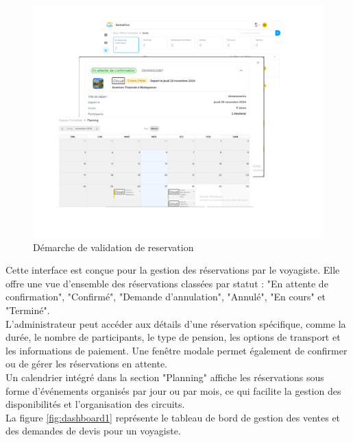 \documentclass[12pt]{report}
\begin{document}
			\begin{figure}[h]
				\centering
				\includegraphics[width=\textwidth]{validationReservation.png}
				\caption{Démarche de validation de reservation}
				\label{fig:validationReservation}
			\end{figure}
			\FloatBarrier

			Cette interface est conçue pour la gestion des réservations par le voyagiste. Elle offre une vue d'ensemble des réservations classées par statut : "En attente de confirmation", "Confirmé", "Demande d'annulation", "Annulé", "En cours" et "Terminé".\\

L'administrateur peut accéder aux détails d'une réservation spécifique, comme la durée, le nombre de participants, le type de pension, les options de transport et les informations de paiement. Une fenêtre modale permet également de confirmer ou de gérer les réservations en attente.\\

Un calendrier intégré dans la section "Planning" affiche les réservations sous forme d'événements organisés par jour ou par mois, ce qui facilite la gestion des disponibilités et l'organisation des circuits.\\


			La figure \ref{fig:dashboard1} représente le tableau de bord de gestion des ventes et des demandes de devis pour un voyagiste.
\end{document}
